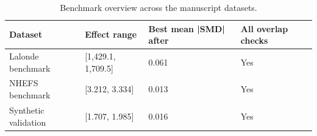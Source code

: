 \begin{table}[t!]
\centering
\footnotesize
\caption{Benchmark overview across the manuscript datasets.}
\label{tab:paper-benchmark-overview}
\setlength{\tabcolsep}{4.5pt}
\begin{tabular}{llll}
\hline
Dataset & Effect range & Best mean |SMD| after & All overlap checks \\
\hline
Lalonde benchmark & [1,429.1, 1,709.5] & 0.061 & Yes \\
NHEFS benchmark & [3.212, 3.334] & 0.013 & Yes \\
Synthetic validation & [1.707, 1.985] & 0.016 & Yes \\
\hline
\end{tabular}
\end{table}
